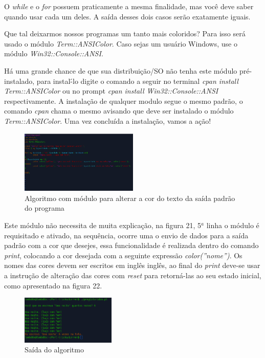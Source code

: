 O \textit{while} e o \textit{for} possuem praticamente a mesma finalidade, mas voc\^e deve saber quando usar cada um deles. A sa\'ida desses dois casos 
ser\~ao exatamente iguais.

Que tal deixarmos nossos programas um tanto mais coloridos? Para isso ser\'a usado o m\'odulo \textit{Term::ANSIColor}. Caso sejas um usu\'ario Windows, use 
o m\'odulo \textit{Win32::Console::ANSI}.

H\'a uma grande chance de que sua distribui\c{c}\~ao/SO n\~ao tenha este m\'odulo pr\'e-instalado, para instal\'-lo digite o comando a seguir no terminal 
\textit{cpan install Term::ANSIColor} ou no prompt \textit{cpan install Win32::Console::ANSI} respectivamente. A instala\c{c}\~ao de qualquer modulo segue o 
mesmo padr\~ao, o comando \textit{cpan} chama o mesmo avisando que deve ser instalado o m\'odulo \textit{Term::ANSIColor}. Uma vez conclu\'ida a 
instala\c{c}\~ao, vamos a a\c{c}\~ao!

\begin{figure}[!htb]
	\centering
	\includegraphics[width=0.5\textwidth]{../5_figuras/image21}
	\caption{Algoritmo com m\'odulo para alterar a cor do texto da sa\'ida padr\~ao do programa}
\end{figure}

Este m\'odulo n\~ao necessita de muita explica\c{c}\~ao, na figura 21, 5$^a$ linha o m\'odulo \'e requisitado e ativado, na sequ\^encia, ocorre uma o envio de
dados para a sa\'ida padr\~ao com a cor que desejes, essa funcionalidade \'e realizada dentro do comando \textit{print}, colocando a cor desejada com a 
seguinte express\~ao \textit{color(''nome'')}. Os nomes das cores devem ser escritos em ingl\^es ingl\^es, ao final do \textit{print} deve-se usar a 
instru\c{c}\~ao de altera\c{c}\~ao das cores com \textit{reset} para retorn\'a-las ao seu estado inicial, como apresentado na figura 22.  

\begin{figure}[!htb]
	\centering
	\includegraphics[width=0.4\textwidth]{../5_figuras/image22}
	\caption{Sa\'ida do algoritmo}
\end{figure}

